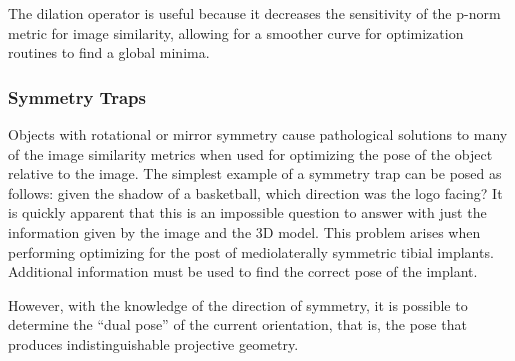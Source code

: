 The dilation operator is useful because it decreases the sensitivity of the p-norm metric for image similarity, allowing for a smoother curve for optimization routines to find a global minima.

\subsubsection{Symmetry Traps}
Objects with rotational or mirror symmetry cause pathological solutions to many of the image similarity metrics when used for optimizing the pose of the object relative to the image. The simplest example of a symmetry trap can be posed as follows: given the shadow of a basketball, which direction was the logo facing? It is quickly apparent that this is an impossible question to answer with just the information given by the image and the 3D model. This problem arises when performing optimizing for the post of mediolaterally symmetric tibial implants. Additional information must be used to find the correct pose of the implant.

However, with the knowledge of the direction of symmetry, it is possible to determine the ``dual pose'' of the current orientation, that is, the pose that produces indistinguishable projective geometry. \cite{daems}